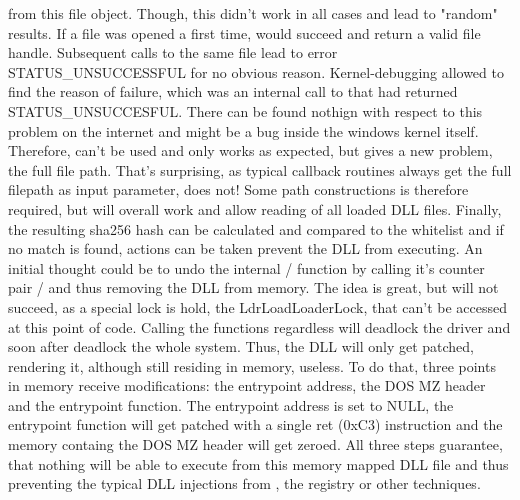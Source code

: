 from this file object. Though, this didn't work in all cases and lead to "random" results. If a file was opened a first time,  would succeed and return a valid file handle. Subsequent calls to the same file lead to error STATUS\_UNSUCCESSFUL for no obvious reason. Kernel-debugging allowed to find the reason of failure, which was an internal call to  that had returned STATUS\_UNSUCCESFUL. There can be found nothign with respect to this problem on the internet and might be a bug inside the windows kernel itself. Therefore,  can't be used and only  works as expected, but gives a new problem, the full file path. That's surprising, as typical callback routines always get the full filepath as input parameter,  does not! Some path constructions is therefore required, but will overall work and allow reading of all loaded DLL files. Finally, the resulting sha256 hash can be calculated and compared to the whitelist and if no match is found, actions can be taken prevent the DLL from executing. An initial thought could be to undo the internal  /  function by calling it's counter pair  /  and thus removing the DLL from memory. The idea is great, but will not succeed, as a special lock is hold, the LdrLoadLoaderLock, that can't be accessed at this point of code. Calling the functions regardless will deadlock the driver and soon after deadlock the whole system. Thus, the DLL will only get patched, rendering it, although still residing in memory, useless. To do that, three points in memory receive modifications: the entrypoint address, the DOS MZ header and the entrypoint function. The entrypoint address is set to NULL, the entrypoint function will get patched with a single ret (0xC3) instruction and the memory containg the DOS MZ header will get zeroed. All three steps guarantee, that nothing will be able to execute from this memory mapped DLL file and thus preventing the typical DLL injections from , the registry or other techniques.